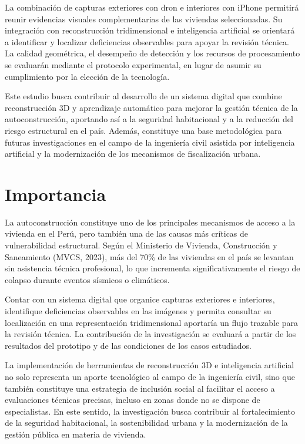 \documentclass[12pt,oneside]{report}
\begin{document}
La combinación de capturas exteriores con dron e interiores con iPhone permitirá reunir evidencias visuales complementarias de las viviendas seleccionadas. Su integración con reconstrucción tridimensional e inteligencia artificial se orientará a identificar y localizar deficiencias observables para apoyar la revisión técnica. La calidad geométrica, el desempeño de detección y los recursos de procesamiento se evaluarán mediante el protocolo experimental, en lugar de asumir su cumplimiento por la elección de la tecnología.\par

Este estudio busca contribuir al desarrollo de un sistema digital que combine reconstrucción 3D y aprendizaje automático para mejorar la gestión técnica de la autoconstrucción, aportando así a la seguridad habitacional y a la reducción del riesgo estructural en el país. Además, constituye una base metodológica para futuras investigaciones en el campo de la ingeniería civil asistida por inteligencia artificial y la modernización de los mecanismos de fiscalización urbana.\par

\section{Importancia}
La autoconstrucción constituye uno de los principales mecanismos de acceso a la vivienda en el Perú, pero también una de las causas más críticas de vulnerabilidad estructural. Según el Ministerio de Vivienda, Construcción y Saneamiento (MVCS, 2023), más del 70\% de las viviendas en el país se levantan sin asistencia técnica profesional, lo que incrementa significativamente el riesgo de colapso durante eventos sísmicos o climáticos.\par

Contar con un sistema digital que organice capturas exteriores e interiores, identifique deficiencias observables en las imágenes y permita consultar su localización en una representación tridimensional aportaría un flujo trazable para la revisión técnica. La contribución de la investigación se evaluará a partir de los resultados del prototipo y de las condiciones de los casos estudiados.\par

La implementación de herramientas de reconstrucción 3D e inteligencia artificial no solo representa un aporte tecnológico al campo de la ingeniería civil, sino que también constituye una estrategia de inclusión social al facilitar el acceso a evaluaciones técnicas precisas, incluso en zonas donde no se dispone de especialistas. En este sentido, la investigación busca contribuir al fortalecimiento de la seguridad habitacional, la sostenibilidad urbana y la modernización de la gestión pública en materia de vivienda.\par
\end{document}
